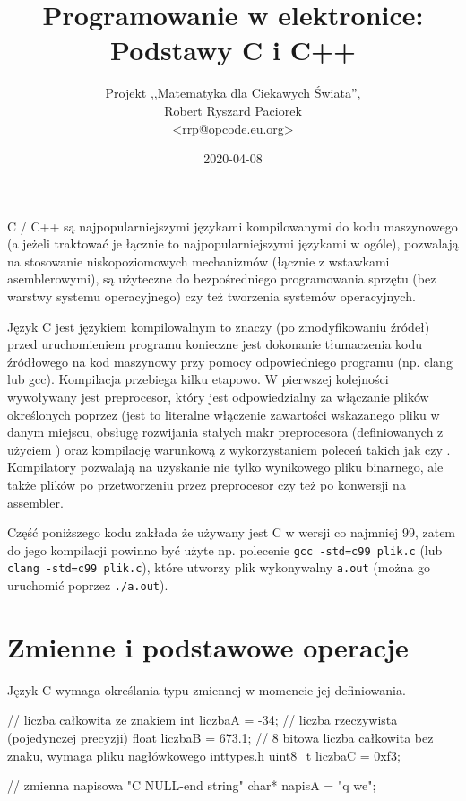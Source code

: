 \documentclass{pdfBooklets}
\title{Programowanie w elektronice: Podstawy C i C++}
\author{%
	Projekt ,,Matematyka dla Ciekawych Świata'',\\
	Robert Ryszard Paciorek\\\normalsize\ttfamily <rrp@opcode.eu.org>
}
\date  {2020-04-08}
\begin{document}
\maketitle

C / C++ są najpopularniejszymi językami kompilowanymi do kodu maszynowego (a jeżeli traktować je łącznie to najpopularniejszymi językami w ogóle), pozwalają na stosowanie niskopoziomowych mechanizmów (łącznie z wstawkami asemblerowymi), są użyteczne do bezpośredniego programowania sprzętu (bez warstwy systemu operacyjnego) czy też tworzenia systemów operacyjnych.

Język C jest językiem kompilowalnym to znaczy (po zmodyfikowaniu źródeł) przed uruchomieniem programu konieczne jest dokonanie tłumaczenia kodu źródłowego na kod maszynowy przy pomocy odpowiedniego programu (np. clang lub gcc). Kompilacja przebiega kilku etapowo. W pierwszej kolejności wywoływany jest preprocesor, który jest odpowiedzialny za włączanie plików określonych poprzez  (jest to literalne włączenie zawartości wskazanego pliku w danym miejscu, obsługę rozwijania stałych makr preprocesora (definiowanych z użyciem ) oraz kompilację warunkową z wykorzystaniem poleceń takich jak  czy . Kompilatory pozwalają na uzyskanie nie tylko wynikowego pliku binarnego, ale także plików po przetworzeniu przez preprocesor czy też po konwersji na assembler.

Część poniższego kodu zakłada że używany jest C w wersji co najmniej 99, zatem do jego kompilacji powinno być użyte np. polecenie \Verb#gcc -std=c99 plik.c# (lub \Verb#clang -std=c99 plik.c#), które utworzy plik wykonywalny \Verb#a.out# (można go uruchomić poprzez \Verb#./a.out#).

\section{Zmienne i podstawowe operacje}

Język C wymaga określania typu zmiennej w momencie jej definiowania.

\begin{CodeFrame*}[c]{}
// liczba całkowita ze znakiem
int     liczbaA = -34;
// liczba rzeczywista (pojedynczej precyzji)
float   liczbaB = 673.1;
// 8 bitowa liczba całkowita bez znaku, wymaga pliku nagłówkowego inttypes.h
uint8_t liczbaC = 0xf3;

// zmienna napisowa "C NULL-end string"
char* napisA = "q we";
\end{CodeFrame*}
\end{document}
